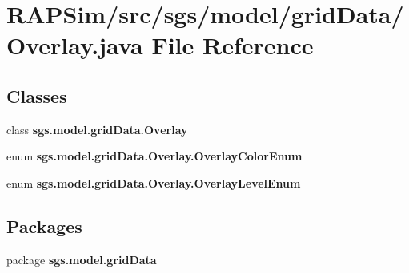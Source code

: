 \section{R\-A\-P\-Sim/src/sgs/model/grid\-Data/\-Overlay.java File Reference}
\label{_overlay_8java}
\subsection*{Classes}
\begin{DoxyCompactItemize}
\item 
class {\bf sgs.\-model.\-grid\-Data.\-Overlay}
\item 
enum {\bf sgs.\-model.\-grid\-Data.\-Overlay.\-Overlay\-Color\-Enum}
\item 
enum {\bf sgs.\-model.\-grid\-Data.\-Overlay.\-Overlay\-Level\-Enum}
\end{DoxyCompactItemize}
\subsection*{Packages}
\begin{DoxyCompactItemize}
\item 
package {\bf sgs.\-model.\-grid\-Data}
\end{DoxyCompactItemize}
